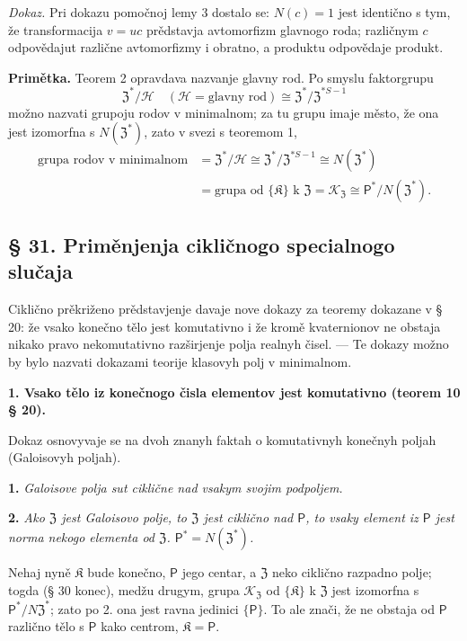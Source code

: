 \documentclass[11pt]{article}
\begin{document}
\noindent\emph{Dokaz.} Pri dokazu pomočnoj lemy 3 dostalo se: \(N(c)=1\) jest identično s tym, že transformacija \(v=uc\) prědstavja avtomorfizm glavnogo roda; različnym \(c\) odpovědajut različne avtomorfizmy i obratno, a produktu odpovědaje produkt.

\noindent\textbf{Primětka.} Teorem 2 opravdava nazvanje glavny rod. Po smyslu faktorgrupu
\[
\mathfrak Z^*/\mathscr H
\quad(\mathscr H=\text{glavny rod})
\cong\mathfrak Z^*/\mathfrak Z^{*S-1}
\]
možno nazvati grupoju rodov v minimalnom; za tu grupu imaje město, že ona jest izomorfna s \(N(\mathfrak Z^*)\), zato v svezi s teoremom 1,
\[
\begin{aligned}
\text{grupa rodov v minimalnom}
&=\mathfrak Z^*/\mathscr H
 \cong\mathfrak Z^*/\mathfrak Z^{*S-1}
 \cong N(\mathfrak Z^*)\\
&=\text{grupa od }\{\mathfrak K\}\text{ k }\mathfrak Z
 =\mathscr K_{\mathfrak Z}
 \cong \mathsf{P}^*/N(\mathfrak Z^*).
\end{aligned}
\]

\subsection*{§ 31. Priměnjenja cikličnogo specialnogo slučaja}\label{anwendungen-des-zyklischen-spezialfalles}

Ciklično prěkriženo prědstavjenje davaje nove dokazy za teoremy dokazane v § 20: že vsako konečno tělo jest komutativno i že kromě kvaternionov ne obstaja nikako pravo nekomutativno razširjenje polja realnyh čisel. --- Te dokazy možno by bylo nazvati dokazami teorije klasovyh polj v minimalnom.

\noindent\textbf{1. Vsako tělo iz konečnogo čisla elementov jest komutativno (teorem 10 § 20).}

Dokaz osnovyvaje se na dvoh znanyh faktah o komutativnyh konečnyh poljah (Galoisovyh poljah).

\noindent\textbf{1.} \emph{Galoisove polja sut ciklične nad vsakym svojim podpoljem.}

\noindent\textbf{2.} \emph{Ako \(\mathfrak Z\) jest Galoisovo polje, to \(\mathfrak Z\) jest ciklično nad \(\mathsf{P}\), to vsaky element iz \(\mathsf{P}\) jest norma nekogo elementa od \(\mathfrak Z\). \(\mathsf{P}^*=N(\mathfrak Z^*)\).}

Nehaj nyně \(\mathfrak K\) bude konečno, \(\mathsf{P}\) jego centar, a \(\mathfrak Z\) neko ciklično razpadno polje; togda (§ 30 konec), medžu drugym, grupa \(\mathscr K_{\mathfrak Z}\) od \(\{\mathfrak K\}\) k \(\mathfrak Z\) jest izomorfna s \(\mathsf{P}^*/N\mathfrak Z^*\); zato po 2. ona jest ravna jedinici \(\{\mathsf{P}\}\). To ale znači, že ne obstaja od \(\mathsf{P}\) različno tělo s \(\mathsf{P}\) kako centrom, \(\mathfrak K=\mathsf{P}\).
\end{document}
